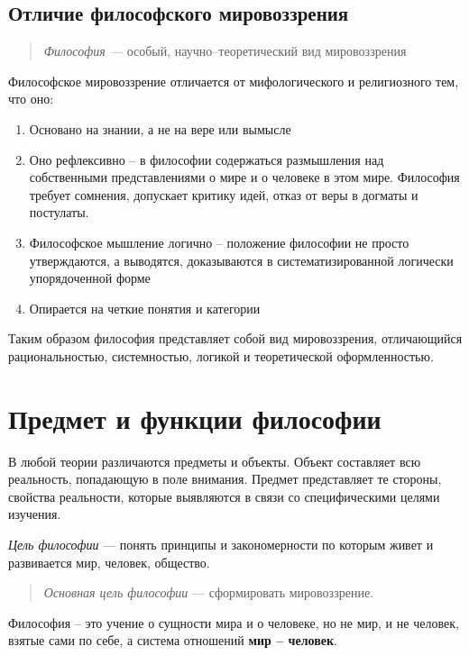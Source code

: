 \documentclass[a4paper, 14pt]{extreport}
\begin{document}
\subsection{Отличие философского мировоззрения}

\begin{quote}
\emph{Философия ---}
особый, научно--теоретический вид мировоззрения

\end{quote}

Философское мировоззрение отличается от мифологического и религиозного
тем, что оно:

\begin{enumerate}
\def\labelenumi{\arabic{enumi}.}

\item
  Основано на знании, а не на вере или вымысле
\item
  Оно рефлексивно -- в философии содержаться размышления над
  собственными представлениями о мире и о человеке в этом мире.
  Философия требует сомнения, допускает критику идей, отказ от веры в
  догматы и постулаты.
\item
  Философское мышление логично -- положение философии не просто
  утверждаются, а выводятся, доказываются в систематизированной
  логически упорядоченной форме
\item
  Опирается на четкие понятия и категории
\end{enumerate}

Таким образом философия представляет собой вид мировоззрения,
отличающийся рациональностью, системностью, логикой и теоретической
оформленностью.

\section{Предмет и функции философии}

В любой теории различаются предметы и объекты. Объект составляет всю
реальность, попадающую в поле внимания. Предмет представляет те стороны,
свойства реальности, которые выявляются в связи со специфическими целями
изучения.

\emph{Цель философии} ---
понять принципы и закономерности по которым живет и развивается мир,
человек, общество.


\begin{quote}
\emph{Основная цель философии} --- сформировать мировоззрение.
\end{quote}

Философия -- это учение о сущности мира и о человеке, но не мир, и не
человек, взятые сами по себе, а система отношений \textbf{мир --
человек}.
\end{document}
